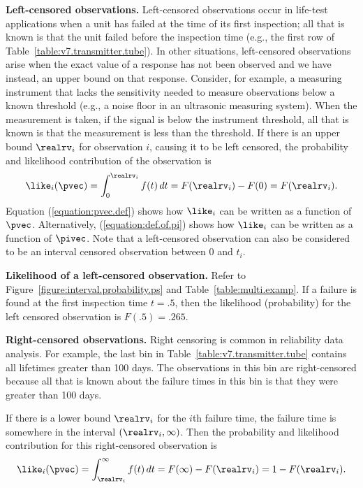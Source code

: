 \noindent
{\bf Left-censored observations.}
Left-censored observations occur in life-test applications when a unit
has failed at the time of its first inspection; all that is known is
that the unit failed before the inspection time (e.g., the first row
of Table~\ref{table:v7.transmitter.tube}). In other situations,
left-censored observations arise when the exact value of a response
has not been observed and we have instead, an upper bound on that
response. Consider, for example, a measuring instrument that lacks the
sensitivity needed to measure observations below a known threshold
(e.g., a noise floor in an ultrasonic measuring system).  When the
measurement is taken, if the signal is below the instrument threshold,
all that is known is that the measurement is less than the threshold.
If there is an upper bound $\realrv_{i}$ for observation $i$, causing
it to be left censored, the probability and likelihood contribution of
the observation is
\begin{equation}
\label{equation:left.censored.likelihood}
\like_{i}(\pvec)=\int_{0}^{\realrv_{i}}f(t)\,dt=
F(\realrv_{i})-F(0)=
F(\realrv_{i}).
\end{equation}
Equation (\ref{equation:pvec.def}) shows how $\like_{i}$ can be
written as a function of $\pvec$. Alternatively,
(\ref{equation:def.of.pi}) shows how $\like_{i}$ can be written as a
function of $\pivec$.  Note that a left-censored observation can also
be considered to be an interval censored observation between 0 and
$t_{i}$.

\begin{example}{\bf Likelihood of a left-censored observation.}
Refer to Figure~\ref{figure:interval.probability.ps} and
Table~\ref{table:multi.examp}. If a failure is found at the first
inspection time $t=.5$, then the likelihood (probability) for the left
censored observation is $F(.5) = .265$.
\end{example}

\noindent
{\bf Right-censored observations.}
Right censoring is common in reliability data
analysis.  For example, the last bin in
Table~\ref{table:v7.transmitter.tube} contains all lifetimes greater
than 100 days.  The observations in this bin are right-censored
because all that is known about the failure times in this bin is
that they were greater than 100 days.

If there is a lower bound $\realrv_{i}$ for the $i$th failure time,
the failure time is somewhere in the interval $(\realrv_{i},
\infty)$. Then the probability and likelihood contribution for this
right-censored observation is
\begin{equation}
\label{equation:right.censored}
\like_{i}(\pvec)=\int_{\realrv_{i}}^{\infty}f(t)\,dt=
F( \infty )-F(\realrv_{i})=
1-F(\realrv_{i}).
\end{equation}

